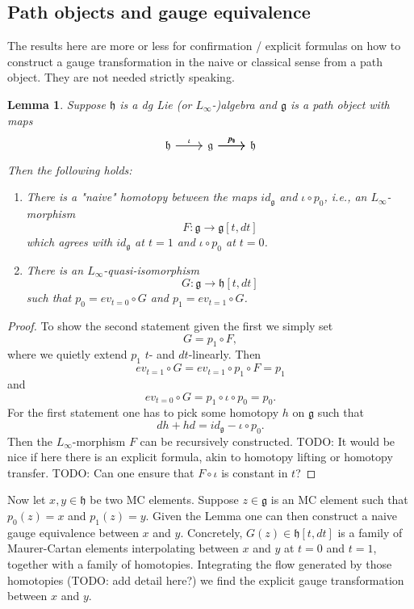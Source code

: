 \documentclass[a4paper]{amsart}
\theoremstyle{plain}
\newtheorem{lemma}[thm]{Lemma}
\theoremstyle{definition}
\newcommand{\alg}[1]{\mathfrak{{#1}}}
\begin{document}
\subsection{Path objects and gauge equivalence}\label{app:pathobjects}
The results here are more or less for confirmation / explicit formulas on how to construct a gauge transformation in the naive or classical sense from a path object. They are not needed strictly speaking.
\begin{lemma}
Suppose $\alg h$ is a dg Lie (or $L_\infty$-)algebra and $\alg g$ is a path object with maps 
\[
\begin{tikzcd}
\alg h \ar{r}{\iota} & \alg g \ar{r}{p_0} \ar{r}{p_1} & \alg h
\end{tikzcd}
\]
Then the following holds:
\begin{enumerate}
\item There is a "naive" homotopy between the maps $\mathit{id}_{\alg g}$ and $\iota\circ p_0$, i.e., an $L_\infty$-morphism
\[
F: \alg g\to \alg g[t,dt]
\]
which agrees with $\mathit{id}_{\alg g}$ at $t=1$ and $\iota\circ p_0$ at $t=0$.
\item There is an $L_\infty$-quasi-isomorphism
\[
G: \alg g\to \alg h[t,dt]
\]
such that $p_0=ev_{t=0}\circ G$ and $p_1=ev_{t=1}\circ G$.
\end{enumerate}
\end{lemma}
\begin{proof}
To show the second statement given the first we simply set 
\[
G = p_1\circ F,
\]
where we quietly extend $p_1$ $t$- and $dt$-linearly. 
Then 
\[
ev_{t=1}\circ G=ev_{t=1}\circ p_1 \circ F = p_1 
\]
and 
\[
ev_{t=0}\circ G=p_1 \circ \iota \circ p_0 = p_0. 
\]
For the first statement one has to pick some homotopy $h$ on $\alg g$ such that
\[
dh+hd = \mathit{id}_{\alg g} - \iota\circ p_0.
\]
Then the $L_\infty$-morphism $F$ can be recursively constructed.
TODO: It would be nice if here there is an explicit formula, akin to homotopy lifting or homotopy transfer.
TODO: Can one ensure that $F\circ \iota$ is constant in $t$?
\end{proof}

Now let $x,y\in \alg h$ be two MC elements. Suppose $z\in \alg g$ is an MC element such that $p_0(z)=x$ and $p_1(z)=y$.  
Given the Lemma one can then construct a naive gauge equivalence between $x$ and $y$.
Concretely, $G(z)\in \alg h[t,dt]$ is a family of Maurer-Cartan elements interpolating between $x$ and $y$ at $t=0$ and $t=1$, together with a family of homotopies. Integrating the flow generated by those homotopies (TODO: add detail here?) we find the explicit gauge transformation between $x$ and $y$.
\end{document}
